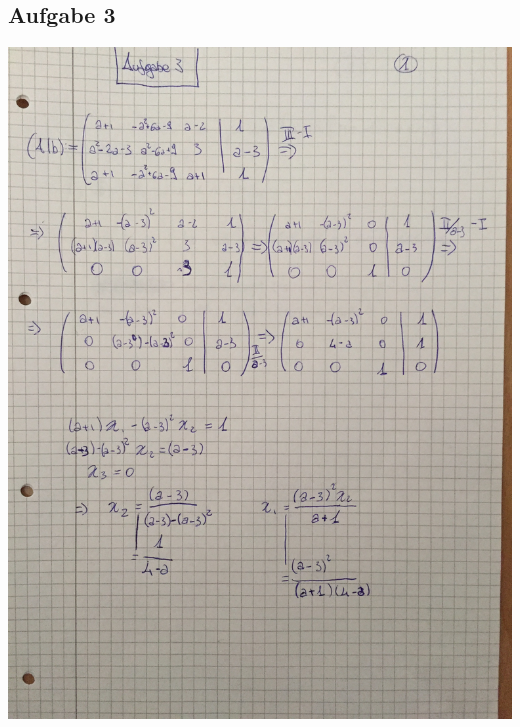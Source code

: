\documentclass[10pt,a4paper]{article}
\begin{document}
\subsection{Aufgabe 3}
\includegraphics[scale=0.2, angle=270]{A3_1.jpg}
\newpage
\end{document}
